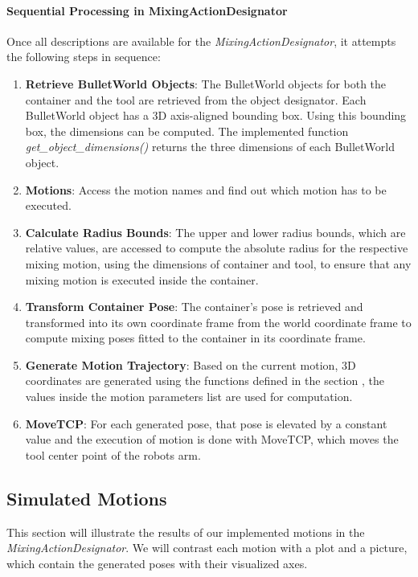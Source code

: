 \paragraph*{Sequential Processing in MixingActionDesignator}
Once all descriptions are available for the \textit{MixingActionDesignator}, it attempts the following steps in sequence:

\begin{enumerate}
    \item \textbf{Retrieve BulletWorld Objects}: The BulletWorld objects for both the container and the tool are retrieved from the object designator. 
    Each BulletWorld object has a 3D axis-aligned bounding box. Using this bounding box, the dimensions can be computed. 
    The implemented function \textit{get\_object\_dimensions()} returns the three dimensions of each BulletWorld object.
    \item \textbf{Motions}: Access the motion names and find out which motion has to be executed.
    \item \textbf{Calculate Radius Bounds}: The upper and lower radius bounds, which are relative values, 
    are accessed to compute the absolute radius for the respective mixing motion, using the dimensions of container and tool, to ensure
    that any mixing motion is executed inside the container.
    \item \textbf{Transform Container Pose}: The container's pose is retrieved and transformed into its own coordinate frame from the world coordinate frame to 
    compute mixing poses fitted to the container in its coordinate frame.
    \item \textbf{Generate Motion Trajectory}: Based on the current motion, 3D coordinates are generated using the functions defined in the section ,
    the values inside the motion parameters list are used for computation.
    \item \textbf{MoveTCP}: For each generated pose, that pose is elevated by a constant value and the execution of motion is done with MoveTCP, which 
    moves the tool center point of the robots arm.
    
\end{enumerate}
\subsection{Simulated Motions}
\label{sec:simulated motions}

This section will illustrate the results of our implemented motions in the \textit{MixingActionDesignator}. 
We will contrast each motion with a plot and a picture, which contain the generated poses with their visualized axes.

